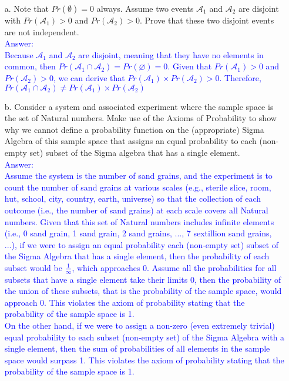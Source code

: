 \documentclass[letterpaper, 11pt]{article}
\begin{document}
\begin{itemize}
\item[a.] Note that $Pr(\emptyset)=0$ always.  Assume two events $\mathcal{A}_1$ and $\mathcal{A}_2$ are disjoint with $Pr(\mathcal{A}_1)>0$ and $Pr(\mathcal{A}_2)>0$.  Prove that these two disjoint events are not independent.\\

\textcolor{blue}{Answer:\\
Because $\mathcal{A}_1$ and $\mathcal{A}_2$ are disjoint, meaning that they have no elements in common, then $Pr(\mathcal{A}_1 \cap \mathcal{A}_2) = Pr(\varnothing) = 0$. Given that $Pr(\mathcal{A}_1)>0$ and $Pr(\mathcal{A}_2)>0$, we can derive that $Pr(\mathcal{A}_1) \times Pr(\mathcal{A}_2) > 0$. Therefore, $Pr(\mathcal{A}_1 \cap \mathcal{A}_2) \neq Pr(\mathcal{A}_1) \times Pr(\mathcal{A}_2)$
}\\

\item[b.] Consider a system and associated experiment where the sample space is the set of Natural numbers.  Make use of the Axioms of Probability to show why we cannot define a probability function on the (appropriate) Sigma Algebra of this sample space that assigns an equal probability to each (non-empty set) subset of the Sigma algebra that has a single element.\\

\textcolor{blue}{Answer:\\
Assume the system is the number of sand grains, and the experiment is to count the number of sand grains at various scales (e.g., sterile slice, room, hut, school, city, country, earth, universe) so that the collection of each outcome (i.e., the number of sand grains) at each scale covers all Natural numbers. Given that this set of Natural numbers includes infinite elements (i.e., 0 sand grain, 1 sand grain, 2 sand grains, ..., 7 sextillion sand grains, ...), if we were to assign an equal probability each (non-empty set) subset of the Sigma Algebra that has a single element, then the probability of each subset would be $\frac{1}{\infty}$, which approaches 0. Assume all the probabilities for all subsets that have a single element take their limits 0, then the probability of the union of these subsets, that is the probability of the sample space, would approach 0. This violates the axiom of probability stating that the probability of the sample space is 1. } \\

\textcolor{blue}{
On the other hand, if we were to assign a non-zero (even extremely trivial) equal probability to each subset (non-empty set) of the Sigma Algebra with a single element, then the sum of probabilities of all elements in the sample space would surpass 1. This violates the axiom of probability stating that the probability of the sample space is 1.}

\end{itemize}
\end{document}
